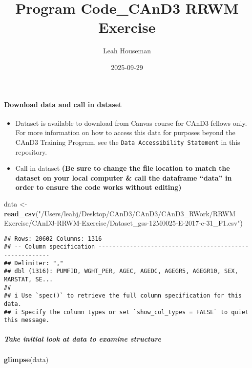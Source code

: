 \documentclass[
]{article}
\title{Program Code\_CAnD3 RRWM Exercise}
\author{Leah Houseman}
\date{2025-09-29}
\newenvironment{Shaded}{\begin{snugshade}}{\end{snugshade}}
\newcommand{\FunctionTok}[1]{\textcolor[rgb]{0.13,0.29,0.53}{\textbf{#1}}}
\newcommand{\NormalTok}[1]{#1}
\newcommand{\OtherTok}[1]{\textcolor[rgb]{0.56,0.35,0.01}{#1}}
\newcommand{\StringTok}[1]{\textcolor[rgb]{0.31,0.60,0.02}{#1}}
\providecommand{\tightlist}{%
  \setlength{\itemsep}{0pt}\setlength{\parskip}{0pt}}
\begin{document}
\maketitle

\paragraph{\texorpdfstring{\textbf{Download data and call in
dataset}}{Download data and call in dataset}}\label{download-data-and-call-in-dataset}

\begin{itemize}
\tightlist
\item
  Dataset is available to download from Canvas course for CAnD3 fellows
  only. For more information on how to access this data for purposes
  beyond the CAnD3 Training Program, see the
  \texttt{Data\ Accessibility\ Statement} in this repository.
\item
  Call in dataset \textbf{(Be sure to change the file location to match
  the dataset on your local computer \& call the dataframe ``data'' in
  order to ensure the code works without editing)}
\end{itemize}

\begin{Shaded}
\begin{Highlighting}[]
\NormalTok{data }\OtherTok{\textless{}{-}} \FunctionTok{read\_csv}\NormalTok{(}\StringTok{"/Users/leahj/Desktop/CAnD3/CAnD3/CAnD3\_RWork/RRWM Exercise/CAnD3{-}RRWM{-}Exercise/Dataset\_gss{-}12M0025{-}E{-}2017{-}c{-}31\_F1.csv"}\NormalTok{)}
\end{Highlighting}
\end{Shaded}

\begin{verbatim}
## Rows: 20602 Columns: 1316
## -- Column specification --------------------------------------------------------
## Delimiter: ","
## dbl (1316): PUMFID, WGHT_PER, AGEC, AGEDC, AGEGR5, AGEGR10, SEX, MARSTAT, SE...
## 
## i Use `spec()` to retrieve the full column specification for this data.
## i Specify the column types or set `show_col_types = FALSE` to quiet this message.
\end{verbatim}

\subparagraph{\texorpdfstring{\textbf{Take initial look at data to
examine
structure}}{Take initial look at data to examine structure}}\label{take-initial-look-at-data-to-examine-structure}

\begin{Shaded}
\begin{Highlighting}[]
\FunctionTok{glimpse}\NormalTok{(data)}
\end{Highlighting}
\end{Shaded}
\end{document}
